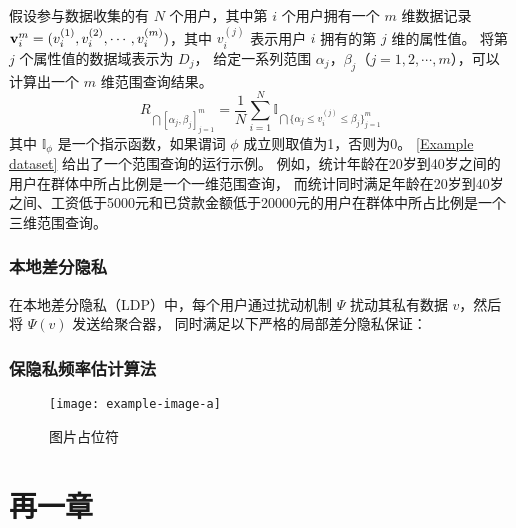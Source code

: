 假设参与数据收集的有 $N$ 个用户，其中第 $i$ 个用户拥有一个 $m$ 维数据记录 ${\bf{v}}^{m}_i = (v^{(1)}_i, v^{(2)}_i, \cdots, v^{(m)}_i)$，其中 $v_i^{(j)}$ 表示用户 $i$ 拥有的第 $j$ 维的属性值。
将第 $j$ 个属性值的数据域表示为 $D_j$，
给定一系列范围 $\alpha_j$，$\beta_j$（$j=1,2,\cdots,m$），可以计算出一个 $m$ 维范围查询结果。
\begin{equation}
    R_{\bigcap {[\alpha_j,\beta_j]}_{j=1}^{m}}=\frac{1}{N} \sum_{i=1}^{N} \mathbb{I}_{\bigcap{\{\alpha_j \leq v_i^{(j)} \leq \beta_j\}_{j=1}^{m}}}
\end{equation}
其中 $\mathbb{I}_\phi$ 是一个指示函数，如果谓词 $\phi$ 成立则取值为1，否则为0。
\autoref{Example dataset} 给出了一个范围查询的运行示例。
例如，统计年龄在20岁到40岁之间的用户在群体中所占比例是一个一维范围查询，
而统计同时满足年龄在20岁到40岁之间、工资低于5000元和已贷款金额低于20000元的用户在群体中所占比例是一个三维范围查询。
\subsection{本地差分隐私}
在本地差分隐私（LDP）中，每个用户通过扰动机制 $\Psi$ 扰动其私有数据 $v$，然后将 $\Psi(v)$ 发送给聚合器，
同时满足以下严格的局部差分隐私保证：
\subsection{保隐私频率估计算法}






\begin{figure}[htbp]
    \centering
    \texttt{[image: example-image-a]}
    \caption{\label{fig:fig-placeholder}图片占位符}
\end{figure}

\chapter{再一章}

